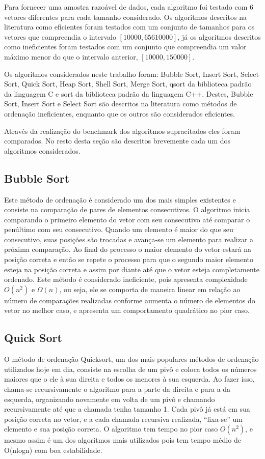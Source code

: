 \documentclass[11pt, brazil, a4paper, usenames, svgnames, dvipsnames]{article}
\begin{document}
Para fornecer uma amostra razoável de dados, cada algoritmo foi testado com 6
vetores diferentes para cada tamanho considerado. Os algoritmos descritos na
literatura como eficientes foram testados com um conjunto de tamanhos para os
vetores que compreendia o intervalo $[10000,65610000]$, já os algoritmos descritos
como ineficientes foram testados com um conjunto que compreendia um valor máximo menor
do que o intervalo anterior, $[10000,150000]$.

Os algoritmos considerados neste trabalho foram: Bubble Sort, Insert Sort, Select Sort, Quick Sort, Heap Sort, Shell Sort, Merge Sort, {\ttfamily qsort} da biblioteca padrão da linguagem C e {\ttfamily sort} da biblioteca padrão da linguagem C++. Destes, Bubble Sort, Insert Sort e Select Sort são descritos na literatura como métodos de ordenação ineficientes, enquanto que os outros são considerados eficientes.

Através da realização do benchmark dos algoritmos supracitados eles foram comparados. No resto desta seção são descritos brevemente cada um dos algoritmos considerados.

\subsection{Bubble Sort}
Este método de ordenação é considerado um dos mais simples existentes e consiste
na comparação de pares de elementos consecutivos. O algoritmo inicia comparando o
primeiro elemento do vetor com seu consecutivo até comparar o penúltimo com seu
consecutivo. Quando um elemento é maior do que seu consecutivo, suas posições são
trocadas e avança-se um elemento para realizar a próxima comparação. Ao final do processo
o maior elemento do vetor estará na posição correta e então se repete o processo para que
o segundo maior elemento esteja na posição correta e assim por diante até que o vetor
esteja completamente ordenado. Este método é considerado ineficiente, pois apresenta
complexidade $O(n^2)$ e $\Omega(n)$, ou seja, ele se comporta de maneira linear em relação ao
número de comparações realizadas conforme aumenta o número de elementos do vetor no melhor caso,
e apresenta um comportamento quadrático no pior caso.

\subsection{Quick Sort}
O método de ordenação Quicksort, um dos mais populares métodos de ordenação utilizados hoje em dia, consiste na escolha de um pivô e coloca todos os números maiores que o ele à sua direita e todos os menores à sua esquerda. Ao fazer isso, chama-se recursivamente o algoritmo para a parte da direita e para a da esquerda, organizando novamente em volta de um pivô e chamando recursivamente até que a chamada tenha tamanho 1.
Cada pivô já está em sua posição correta no vetor, e a cada chamada recursiva realizada, ``fixa-se'' um elemento e sua posição correta.
O algoritmo tem tempo no pior caso $O(n^2)$, e mesmo assim é um dos algoritmos mais utilizados pois tem tempo médio de O(nlogn) com boa estabilidade.
\end{document}
